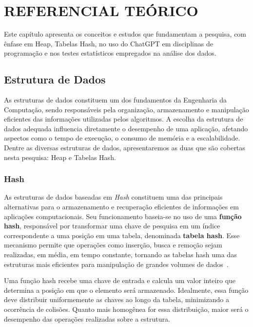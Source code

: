 
\chapter{REFERENCIAL TEÓRICO}
\label{chap:referencial-teorico}

Este capítulo apresenta os conceitos e estudos que fundamentam a pesquisa, com ênfase em Heap, Tabelas Hash, no uso do ChatGPT em disciplinas de programação e nos testes estatísticos empregados na análise dos dados.


\section{Estrutura de Dados}
\label{sec:heap-tabelas-hash}

As estruturas de dados constituem um dos fundamentos da Engenharia da Computação, sendo responsáveis pela organização, armazenamento e manipulação eficientes das informações utilizadas pelos algoritmos. A escolha da estrutura de dados adequada influencia diretamente o desempenho de uma aplicação, afetando aspectos como o tempo de execução, o consumo de memória e a escalabilidade. Dentre as diversas estruturas de dados, apresentaremos as duas que são cobertas nesta pesquisa: Heap e Tabelas Hash.

\subsection{Hash}

As estruturas de dados baseadas em \textit{Hash} constituem uma das principais alternativas para o armazenamento e recuperação eficientes de informações em aplicações computacionais. Seu funcionamento baseia-se no uso de uma \textbf{função hash}, responsável por transformar uma chave de pesquisa em um índice correspondente a uma posição em uma tabela, denominada \textbf{tabela hash}. Esse mecanismo permite que operações como inserção, busca e remoção sejam realizadas, em média, em tempo constante, tornando as tabelas hash uma das estruturas mais eficientes para manipulação de grandes volumes de dados~\cite{cormen2022introduction}.

Uma função hash recebe uma chave de entrada e calcula um valor inteiro que determina a posição em que o elemento será armazenado. Idealmente, essa função deve distribuir uniformemente as chaves ao longo da tabela, minimizando a ocorrência de colisões. Quanto mais homogênea for essa distribuição, maior será o desempenho das operações realizadas sobre a estrutura.

